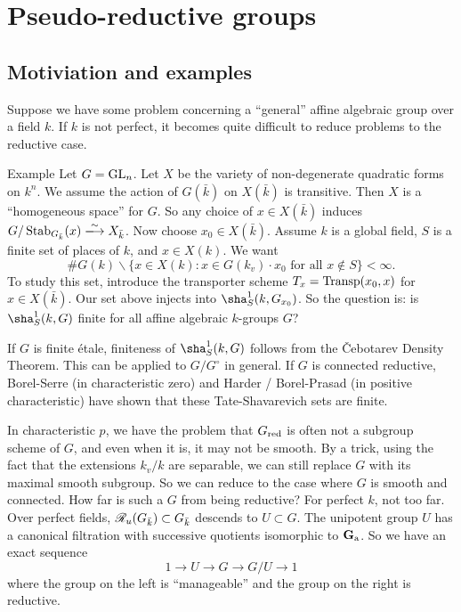 

\section{Pseudo-reductive groups}





\subsection{Motiviation and examples}

Suppose we have some problem concerning a ``general'' affine algebraic group over 
a field $k$. If $k$ is not perfect, it becomes quite difficult to reduce problems 
to the reductive case. 

\begin{enonce}[remark]{Example}
Let $G=\operatorname{GL}_n$. Let $X$ be the variety of non-degenerate quadratic forms 
on $k^n$. We assume the action of $G(\bar k)$ on $X(\bar k)$ is transitive. Then 
$X$ is a ``homogeneous space'' for $G$. So any choice of $x\in X(\bar k)$ induces 
$G/\stabilizer_{G_{\bar k}}(x) \isomorphism X_{\bar k}$. Now choose 
$x_0\in X(\bar k)$. Assume $k$ is a global field, $S$ is a finite set of places of 
$k$, and $x\in X(k)$. We want 
\[
  \# G(k)\backslash \{x\in X(k):x\in G(k_v)\cdot x_0\text{ for all }x\notin S\} < \infty .
\]
To study this set, introduce the transporter scheme $T_x=\operatorname{Transp}(x_0,x)$ for 
$x\in X(\bar k)$. Our set above injects into 
$\sha_S^1(k, G_{x_0})$. So the question is: is $\sha_S^1(k,G)$ finite for all affine 
algebraic $k$-groups $G$?
\end{enonce}

If $G$ is finite \'etale, finiteness of $\sha_S^1(k,G)$ follows from the 
\v Cebotarev Density Theorem. This can be applied to $G/G^\circ$ in general. 
If $G$ is connected reductive, Borel-Serre (in characteristic zero) and 
Harder / Borel-Prasad (in positive characteristic) have shown that these 
Tate-Shavarevich sets are finite. 

In characteristic $p$, we have the problem that $G_{\mathrm{red}}$ is often not a 
subgroup scheme of $G$, and even when it is, it may not be smooth. By a trick, 
using the fact that the extensions $k_v/k$ are separable, we can still replace 
$G$ with its maximal smooth subgroup. So we can reduce to the case where $G$ is 
smooth and connected. How far is such a $G$ from being reductive? For perfect 
$k$, not too far. Over perfect fields, $\mathscr{R}_u(G_{\bar k})\subset G_{\bar k}$ 
descends to $U\subset G$. The unipotent group $U$ has a canonical filtration 
with successive quotients isomorphic to $\mathbf{G}_{\mathrm{a}}$. So we have an 
exact sequence 
\[
  1 \to U \to G \to G/U \to 1
\]
where the group on the left is ``manageable'' and the group on the right is 
reductive. 

